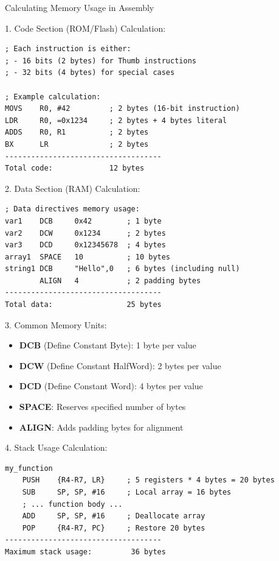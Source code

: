 \begin{KR}{Calculating Memory Usage in Assembly}

1. Code Section (ROM/Flash) Calculation:
\begin{lstlisting}[language=armasm, style=basesmol]
; Each instruction is either:
; - 16 bits (2 bytes) for Thumb instructions
; - 32 bits (4 bytes) for special cases

; Example calculation:
MOVS    R0, #42         ; 2 bytes (16-bit instruction)
LDR     R0, =0x1234     ; 2 bytes + 4 bytes literal
ADDS    R0, R1          ; 2 bytes
BX      LR              ; 2 bytes
------------------------------------
Total code:             12 bytes
\end{lstlisting}

2. Data Section (RAM) Calculation:
\begin{lstlisting}[language=armasm, style=basesmol]
; Data directives memory usage:
var1    DCB     0x42        ; 1 byte
var2    DCW     0x1234      ; 2 bytes
var3    DCD     0x12345678  ; 4 bytes
array1  SPACE   10          ; 10 bytes
string1 DCB     "Hello",0   ; 6 bytes (including null)
        ALIGN   4           ; 2 padding bytes
------------------------------------
Total data:                 25 bytes
\end{lstlisting}

3. Common Memory Units:
\begin{itemize}
  \item \textbf{DCB} (Define Constant Byte): 1 byte per value
  \item \textbf{DCW} (Define Constant HalfWord): 2 bytes per value
  \item \textbf{DCD} (Define Constant Word): 4 bytes per value
  \item \textbf{SPACE}: Reserves specified number of bytes
  \item \textbf{ALIGN}: Adds padding bytes for alignment
\end{itemize}

4. Stack Usage Calculation:
\begin{lstlisting}[language=armasm, style=basesmol]
my_function
    PUSH    {R4-R7, LR}     ; 5 registers * 4 bytes = 20 bytes
    SUB     SP, SP, #16     ; Local array = 16 bytes
    ; ... function body ...
    ADD     SP, SP, #16     ; Deallocate array
    POP     {R4-R7, PC}     ; Restore 20 bytes
------------------------------------
Maximum stack usage:         36 bytes
\end{lstlisting}
\end{KR}


